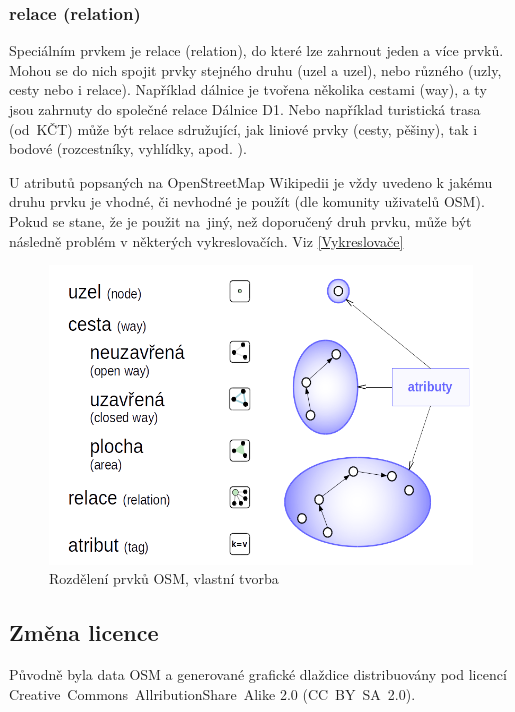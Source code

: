 \subsubsection{relace (relation) }

Speciálním prvkem je relace (relation), do které lze zahrnout
jeden a více prvků. Mohou se do nich spojit prvky stejného druhu (uzel a uzel),
nebo různého (uzly, cesty nebo i relace).
Například dálnice je tvořena několika cestami (way), a ty
jsou zahrnuty do společné relace Dálnice D1. Nebo například turistická trasa
(od~KČT) může být relace sdružující, jak liniové prvky
(cesty, pěšiny), tak i bodové (rozcestníky, vyhlídky, apod. ).

U atributů popsaných na OpenStreetMap Wikipedii \cite{OSMfeatures} je vždy uvedeno
k jakému druhu prvku je
vhodné, či nevhodné je použít (dle komunity uživatelů OSM). Pokud se stane, že je použit
na~jiný, než doporučený druh prvku, může být následně problém v některých vykreslovačích. Viz \ref{Vykreslovače}
\begin{figure}[hbt]%
    \centering
    \includegraphics[scale=0.6]{./pictures/OSMelements.png}
    \caption{Rozdělení prvků OSM, vlastní tvorba}
    \label{fig:rozdělení OSM prvků}
\end{figure}


\subsection{Změna licence}
\label{změna licence}

Původně byla data OSM a generované grafické dlaždice distribuovány pod licencí
Creative~Commons~AllributionShare~Alike 2.0 (CC~BY~SA~2.0).


